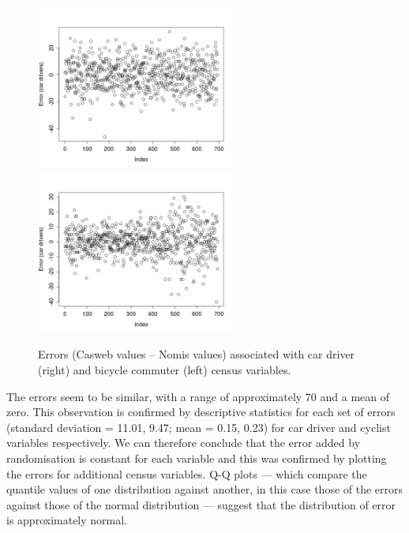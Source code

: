 \documentclass[a4paper, 11pt, twoside]{article}
\begin{document}
 \begin{figure}[h]
 \centering
 \includegraphics[width=6.6cm]{car-ers}
\includegraphics[width=6.6cm]{bike-ers}
 \caption[Errors associated with Casweb census variables]
{Errors (Casweb values -- Nomis values) associated with car driver
(right) and bicycle commuter (left) census variables.}
 \label{fig:nomis-ers}
\end{figure}

The errors seem to be similar, with a range of approximately 70 and a mean of
zero. This observation is confirmed by descriptive statistics for each set of
errors (standard deviation = 11.01, 9.47; mean = 0.15, 0.23) for car driver and
cyclist variables respectively. We can therefore conclude that the error added
by randomisation is constant for each variable and this was confirmed by plotting
the errors for additional census variables. Q-Q plots --- which compare the 
quantile values of one distribution against another, in this case those of 
the errors against those of the normal distribution --- suggest that the
distribution of error is approximately normal.
\end{document}
